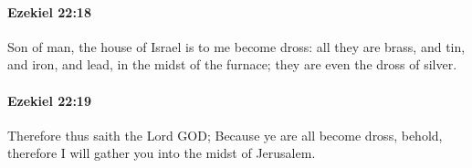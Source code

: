 		\paragraph{Ezekiel 22:18} %
			\label{EZEKIEL-22-18}

			Son of man, the house of Israel is to me become dross: all they are brass, and tin, and iron, and lead, in the midst of the furnace; they are even the dross of silver.


		\paragraph{Ezekiel 22:19} %
			\label{EZEKIEL-22-19}

			Therefore thus saith the Lord GOD; Because ye are all become dross, behold, therefore I will gather you into the midst of Jerusalem.


